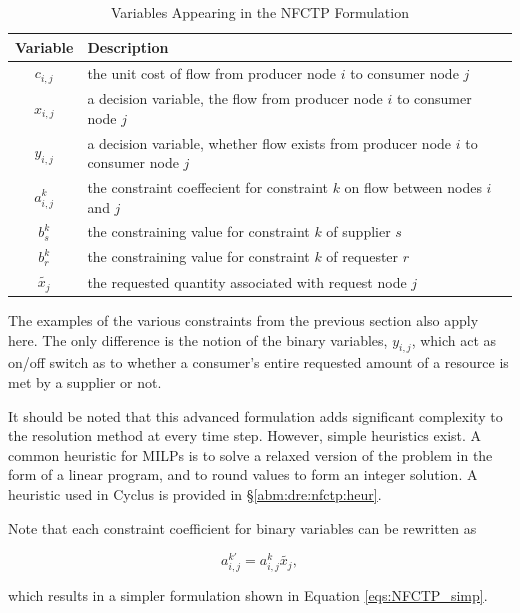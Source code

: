 \begin{table} [h!]
\centering
\begin{tabularx}{\columnwidth-10pt}{|c|X|} %
\hline
Variable    & Description \\
\hline
$c_{i,j}$             & the unit cost of flow
                          from producer node $i$ to consumer node $j$  \\
$x_{i,j}$             & a decision variable, the flow 
                          from producer node $i$ to consumer node $j$  \\
$y_{i,j}$             & a decision variable, whether flow exists 
                          from producer node $i$ to consumer node $j$  \\
$a_{i,j}^k$ & the constraint coeffecient for constraint $k$ 
                          on flow between nodes $i$ and $j$  \\
$b_s^k$   & the constraining value for constraint $k$ of supplier $s$ \\
$b_r^k$   & the constraining value for constraint $k$ of requester $r$ \\
$\tilde{x_j}$ & the requested quantity associated with request node $j$ \\
\hline
\end{tabularx}
\caption{Variables Appearing in the NFCTP Formulation}
\label{tbl:NFCTP-vars}
\end{table}

The examples of the various constraints from the previous section also apply
here. The only difference is the notion of the binary variables, $y_{i,j}$,
which act as on/off switch as to whether a consumer's entire requested amount of
a resource is met by a supplier or not.

It should be noted that this advanced formulation adds significant complexity to
the resolution method at every time step. However, simple heuristics exist. A
common heuristic for MILPs is to solve a relaxed version of the problem in the
form of a linear program, and to round values to form an integer solution. A
heuristic used in Cyclus is provided in \S \ref{abm:dre:nfctp:heur}.

Note that each constraint coefficient for binary variables can be rewritten as 

\begin{equation}
a^{k\prime}_{i,j} = a^k_{i,j} \tilde{x_j}, 
\end{equation}

which results in a simpler formulation shown in Equation \ref{eqs:NFCTP_simp}.

